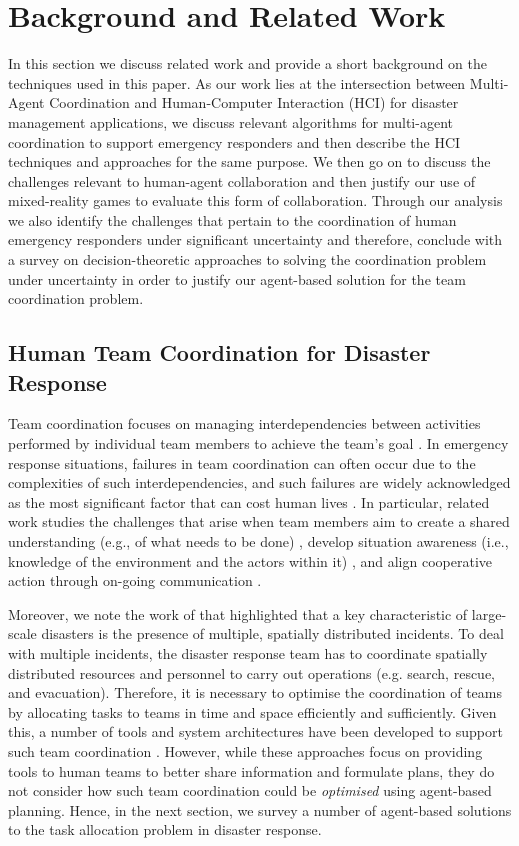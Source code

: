 \section{Background and Related Work}\label{sec:relatedwork}
In this section we discuss related work and provide a short background on the techniques used in this paper.  As our work lies at the intersection between Multi-Agent Coordination and Human-Computer Interaction (HCI) for disaster management applications, we discuss relevant algorithms for multi-agent coordination to support emergency responders and then describe the HCI techniques and approaches for the same purpose. We then go on to discuss the challenges relevant to human-agent collaboration and then justify our use of mixed-reality games to evaluate this form of collaboration.  Through our analysis we also identify the challenges that pertain to the coordination of human emergency responders under significant uncertainty and therefore, conclude with a survey on decision-theoretic approaches to solving the coordination problem under uncertainty in order to justify our agent-based solution for the team coordination problem.
\subsection{Human Team Coordination for Disaster Response}
Team coordination focuses on managing interdependencies between activities performed  by individual team members to achieve the team's goal \cite{Malone1990}. In emergency response situations, failures in team coordination can often occur due to the complexities of such interdependencies, and such failures are widely acknowledged as the most significant factor that can cost human lives \cite[p. 2]{Toups2011}. In particular, related work studies the challenges that arise when team members aim to create a shared understanding (e.g., of what needs to be done) \cite{Convertino2011}, develop situation awareness (i.e., knowledge of the environment and the actors within it) \cite{bader2008digital}, and align cooperative action through on-going communication \cite{Toups2011}.

Moreover, we note the work of \cite{chen2005} that highlighted that a key characteristic of large-scale disasters is the presence of multiple, spatially distributed incidents. To deal with multiple incidents, the disaster response team has to coordinate spatially distributed resources and personnel to carry out operations (e.g. search, rescue, and evacuation). Therefore, it is necessary to optimise the coordination of teams by allocating tasks to teams in time and space efficiently and sufficiently. Given this, a number of tools and system architectures have been developed to support such team coordination \cite{Monares2011,Padilha2010,Convertino2011}. However, while these approaches focus on providing tools to human teams to better share  information and formulate plans,  they do not consider how such team coordination could be \emph{optimised} using agent-based planning. Hence, in the next section, we  survey a number of agent-based solutions to the task allocation problem in disaster response.

